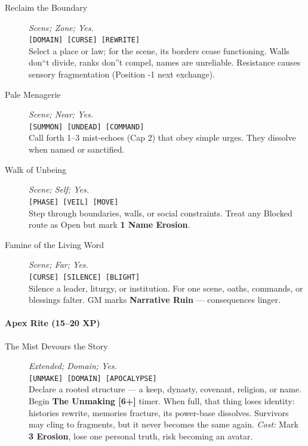 \documentclass[11pt]{article}
\begin{document}
\begin{description}

  \item[Reclaim the Boundary] \emph{Scene; Zone; Yes.} \\
  \texttt{[DOMAIN] [CURSE] [REWRITE]} \\
  Select a place or law; for the scene, its borders cease functioning.  
  Walls don``t divide, ranks don''t compel, names are unreliable.  
  Resistance causes sensory fragmentation (Position -1 next exchange).

  \item[Pale Menagerie] \emph{Scene; Near; Yes.} \\
  \texttt{[SUMMON] [UNDEAD] [COMMAND]} \\
  Call forth 1--3 mist-echoes (Cap 2) that obey simple urges.  
  They dissolve when named or sanctified.

  \item[Walk of Unbeing] \emph{Scene; Self; Yes.} \\
  \texttt{[PHASE] [VEIL] [MOVE]} \\
  Step through boundaries, walls, or social constraints.  
  Treat any Blocked route as Open but mark \textbf{1 Name Erosion}.

  \item[Famine of the Living Word] \emph{Scene; Far; Yes.} \\
  \texttt{[CURSE] [SILENCE] [BLIGHT]} \\
  Silence a leader, liturgy, or institution.  
  For one scene, oaths, commands, or blessings falter.  
  GM marks \textbf{Narrative Ruin} --- consequences linger.

\end{description}

\paragraph*{Apex Rite (15--20 XP)}

\begin{description}

  \item[The Mist Devours the Story] \emph{Extended; Domain; Yes.} \\
  \texttt{[UNMAKE] [DOMAIN] [APOCALYPSE]} \\
  Declare a rooted structure --- a keep, dynasty, covenant, religion, or name.  
  Begin \textbf{The Unmaking [6+]} timer.  
  When full, that thing loses identity:  
  histories rewrite, memories fracture, its power-base dissolves.  
  Survivors may cling to fragments, but it never becomes the same again.  
  \emph{Cost:} Mark \textbf{3 Erosion}, lose one personal truth, risk becoming an avatar.

\end{description}
\end{document}
